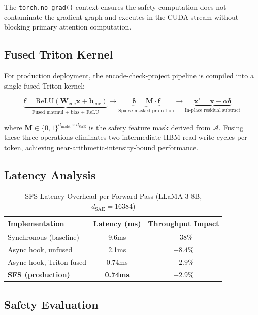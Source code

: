 \documentclass[10pt,twocolumn]{article}
\begin{document}
The \texttt{torch.no\_grad()} context ensures the safety computation does not contaminate the gradient graph and executes in the CUDA stream without blocking primary attention computation.

\subsection{Fused Triton Kernel}

For production deployment, the encode-check-project pipeline is compiled into a single fused Triton kernel:

\begin{equation}
\underbrace{\mathbf{f} = \text{ReLU}(\mathbf{W}_{\text{enc}} \mathbf{x} + \mathbf{b}_{\text{enc}})}_{\text{Fused matmul + bias + ReLU}} \rightarrow \underbrace{\boldsymbol{\delta} = \mathbf{M} \cdot \mathbf{f}}_{\text{Sparse masked projection}} \rightarrow \underbrace{\mathbf{x}' = \mathbf{x} - \alpha\boldsymbol{\delta}}_{\text{In-place residual subtract}}
\end{equation}

where $\mathbf{M} \in \{0,1\}^{d_{\text{model}} \times d_{\text{SAE}}}$ is the safety feature mask derived from $\mathcal{A}$. Fusing these three operations eliminates two intermediate HBM read-write cycles per token, achieving near-arithmetic-intensity-bound performance.

\subsection{Latency Analysis}

\begin{table}[h]
\centering
\caption{SFS Latency Overhead per Forward Pass (LLaMA-3-8B, $d_{\text{SAE}}=16384$)}
\label{tab:sfs}
\begin{tabular}{@{}lcc@{}}
\toprule
\textbf{Implementation} & \textbf{Latency (ms)} & \textbf{Throughput Impact} \\
\midrule
Synchronous (baseline) & 9.6ms & $-38\%$ \\
Async hook, unfused & 2.1ms & $-8.4\%$ \\
Async hook, Triton fused & 0.74ms & $-2.9\%$ \\
\textbf{SFS (production)} & \textbf{0.74ms} & \textbf{$-2.9\%$} \\
\bottomrule
\end{tabular}
\end{table}

\subsection{Safety Evaluation}
\end{document}
